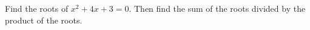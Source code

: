 Find the roots of \(x^2+4x+3=0\). Then find the sum of the roots divided by the product of the roots.
